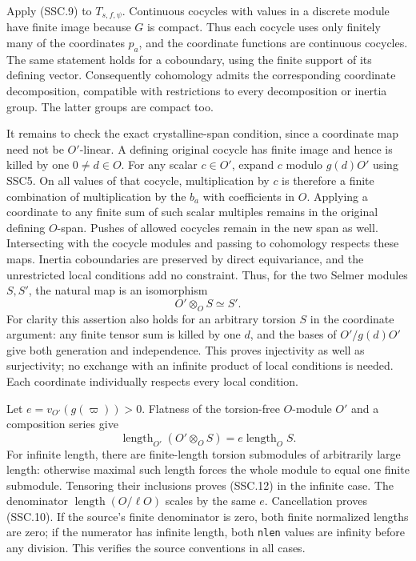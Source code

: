 \documentclass[11pt,a4paper]{article}
\numberwithin{equation}{section}
\theoremstyle{remark}\newtheorem{remark}[theorem]{Remark}
\begin{document}
Apply (SSC.9) to $T_{s,f,\psi}$. Continuous cocycles with values
in a discrete module have finite image because $G$ is compact.
Thus each cocycle uses only finitely many of the coordinates $p_a$,
and the coordinate functions are continuous cocycles. The same
statement holds for a coboundary, using the finite support of its
defining vector. Consequently cohomology admits the corresponding
coordinate decomposition, compatible with restrictions to every
decomposition or inertia group. The latter groups are compact too.

It remains to check the exact crystalline-span condition, since a
coordinate map need not be $O'$-linear. A defining original cocycle
has finite image and hence is killed by one $0\ne d\in O$.
For any scalar $c\in O'$, expand $c$ modulo $g(d)O'$ using SSC5.
On all values of that cocycle, multiplication by $c$ is therefore
a finite combination of multiplication by the $b_a$ with
coefficients in $O$. Applying a coordinate to any finite sum
of such scalar multiples remains in the original defining
$O$-span. Pushes of allowed cocycles remain in the new span as
well. Intersecting with the cocycle modules and passing to
cohomology respects these maps. Inertia coboundaries are preserved
by direct equivariance, and the unrestricted local conditions add
no constraint. Thus, for the two Selmer modules $S,S'$, the natural
map is an isomorphism
\[
                     O'\otimes_O S\simeq S'.                 \tag{SSC.11}
\]
For clarity this assertion also holds for an arbitrary torsion
$S$ in the coordinate argument: any finite tensor sum is killed
by one $d$, and the bases of $O'/g(d)O'$ give both generation and
independence. This proves injectivity as well as surjectivity;
no exchange with an infinite product of local conditions is needed.
Each coordinate individually respects every local condition.

Let $e=v_{O'}(g(\varpi))>0$. Flatness of the torsion-free
$O$-module $O'$ and a composition series give
\[
 \operatorname{length}_{O'}(O'\otimes_O S)
          =e\operatorname{length}_O S.                        \tag{SSC.12}
\]
For infinite length, there are finite-length torsion submodules of
arbitrarily large length: otherwise maximal such length forces
the whole module to equal one finite submodule. Tensoring their
inclusions proves (SSC.12) in the infinite case. The denominator
$\operatorname{length}(O/\ell O)$ scales by the same $e$.
Cancellation proves (SSC.10). If the source's finite denominator
is zero, both finite normalized lengths are zero; if the numerator
has infinite length, both \texttt{nlen} values are infinity before
any division. This verifies the source conventions in all cases.
\end{document}
